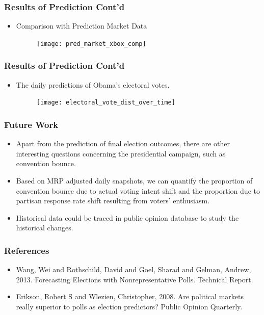 \documentclass[xetex,mathserif,serif]{beamer}
\begin{document}
\begin{frame}
  \frametitle{Results of Prediction Cont'd}
  \begin{itemize}
  \item Comparison with Prediction Market Data
    \begin{figure}[htbp]
      \centering
      \texttt{[image: pred\_market\_xbox\_comp]}
    \end{figure}
  \end{itemize}
\end{frame}

\begin{frame}
  \frametitle{Results of Prediction Cont'd}
  \begin{itemize}
  \item The daily predictions of Obama's electoral votes.
    \begin{figure}[htbp]
      \centering
      \texttt{[image: electoral\_vote\_dist\_over\_time]}
    \end{figure}
  \end{itemize}
\end{frame}

\begin{frame}
  \frametitle{Future Work}
  \begin{itemize}
  \item Apart from the prediction of final election outcomes, there are other
    interesting questions concerning the presidential campaign, such as
    convention bounce.
  \item Based on MRP adjusted daily snapshots, we can quantify the proportion of
    convention bounce due to actual voting intent shift and the proportion due to
    partisan response rate shift resulting from voters' enthusiasm.
  \item Historical data could be traced in public opinion database to study the
    historical changes.
  \end{itemize}
\end{frame}

\begin{frame}
  \frametitle{References}
  \begin{itemize}
  \item Wang, Wei and Rothschild, David and Goel, Sharad and Gelman, Andrew,
    2013. Forecasting Elections with Nonrepresentative Polls. Technical Report.
  \item Erikson, Robert S and Wlezien, Christopher, 2008. Are political markets
    really superior to polls as election predictors? Public Opinion Quarterly.
  \end{itemize}
\end{frame}
\end{document}
